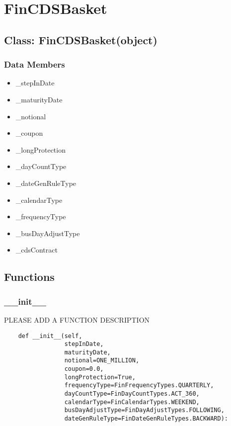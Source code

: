\documentclass[twoside,11pt]{book}
\begin{document}
\newpage
\section{FinCDSBasket}

\subsection*{Class: FinCDSBasket(object)}


\subsubsection*{Data Members}
\begin{itemize}
\item{\_stepInDate}
\item{\_maturityDate}
\item{\_notional}
\item{\_coupon}
\item{\_longProtection}
\item{\_dayCountType}
\item{\_dateGenRuleType}
\item{\_calendarType}
\item{\_frequencyType}
\item{\_busDayAdjustType}
\item{\_cdsContract}
\end{itemize}

\subsection*{Functions}

\subsubsection*{{\bf \_\_init\_\_}}
PLEASE ADD A FUNCTION DESCRIPTION

\begin{lstlisting}
    def __init__(self,
                 stepInDate,
                 maturityDate,
                 notional=ONE_MILLION,
                 coupon=0.0,
                 longProtection=True,
                 frequencyType=FinFrequencyTypes.QUARTERLY,
                 dayCountType=FinDayCountTypes.ACT_360,
                 calendarType=FinCalendarTypes.WEEKEND,
                 busDayAdjustType=FinDayAdjustTypes.FOLLOWING,
                 dateGenRuleType=FinDateGenRuleTypes.BACKWARD):
\end{lstlisting}
\end{document}
